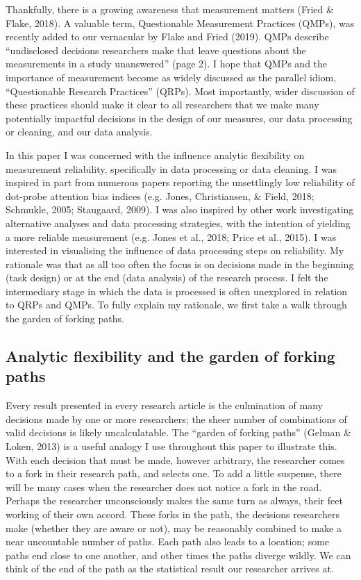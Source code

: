 \documentclass[english,man,floatsintext]{apa6}
\begin{document}
Thankfully, there is a growing awareness that measurement matters (Fried \& Flake, 2018). A valuable term, Questionable Measurement Practices (QMPs), was recently added to our vernacular by Flake and Fried (2019). QMPs describe \enquote{undisclosed decisions researchers make that leave questions about the measurements in a study unanswered} (page 2). I hope that QMPs and the importance of measurement become as widely discussed as the parallel idiom, \enquote{Questionable Research Practices} (QRPs). Most importantly, wider discussion of these practices should make it clear to all researchers that we make many potentially impactful decisions in the design of our measures, our data processing or cleaning, and our data analysis.

In this paper I was concerned with the influence analytic flexibility on measurement reliability, specifically in data processing or data cleaning. I was inspired in part from numerous papers reporting the unsettlingly low reliability of dot-probe attention bias indices (e.g. Jones, Christiansen, \& Field, 2018; Schmukle, 2005; Staugaard, 2009). I was also inspired by other work investigating alternative analyses and data processing strategies, with the intention of yielding a more reliable measurement (e.g. Jones et al., 2018; Price et al., 2015). I was interested in visualising the influence of data processing steps on reliability. My rationale was that as all too often the focus is on decisions made in the beginning (task design) or at the end (data analysis) of the research process. I felt the intermediary stage in which the data is processed is often unexplored in relation to QRPs and QMPs. To fully explain my rationale, we first take a walk through the garden of forking paths.

\hypertarget{analytic-flexibility-and-the-garden-of-forking-paths}{%
\subsection{Analytic flexibility and the garden of forking paths}\label{analytic-flexibility-and-the-garden-of-forking-paths}}

Every result presented in every research article is the culmination of many decisions made by one or more researchers; the sheer number of combinations of valid decisions is likely uncalculatable. The \enquote{garden of forking paths} (Gelman \& Loken, 2013) is a useful analogy I use throughout this paper to illustrate this. With each decision that must be made, however arbitrary, the researcher comes to a fork in their research path, and selects one. To add a little suspense, there will be many cases when the researcher does not notice a fork in the road. Perhaps the researcher unconsciously makes the same turn as always, their feet working of their own accord. These forks in the path, the decisions researchers make (whether they are aware or not), may be reasonably combined to make a near uncountable number of paths. Each path also leads to a location; some paths end close to one another, and other times the paths diverge wildly. We can think of the end of the path as the statistical result our researcher arrives at.
\end{document}
